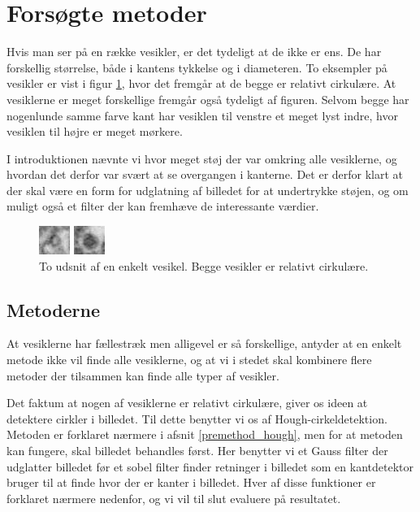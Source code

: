 \section{Forsøgte metoder}
Hvis man ser på en række vesikler, er det tydeligt at de ikke er ens. De har forskellig størrelse, både i kantens tykkelse og i diameteren. To eksempler på vesikler er vist i figur \ref{fig:premethod_ves1}, hvor det fremgår at de begge er relativt cirkulære. At vesiklerne er meget forskellige fremgår også tydeligt af figuren. Selvom begge har nogenlunde samme farve kant har vesiklen til venstre et meget lyst indre, hvor vesiklen til højre er meget mørkere. 

I introduktionen nævnte vi hvor meget støj der var omkring alle vesiklerne, og hvordan det derfor var svært at se overgangen i kanterne. Det er derfor klart at der skal være en form for udglatning af billedet for at undertrykke støjen, og om muligt også et filter der kan fremhæve de interessante værdier.

\begin{figure}[H]
	\begin{minipage}[b]{0.5\linewidth}
		\centering
		\includegraphics[scale=5]{files/premethod/img/ves1.png}
	\end{minipage}
	\hspace{0.5cm}
	\begin{minipage}[b]{0.5\linewidth}
		\centering
		\includegraphics[scale=5]{files/premethod/img/ves2.png}
	\end{minipage}
	\caption{To udsnit af en enkelt vesikel. Begge vesikler er relativt cirkulære.\label{fig:premethod_ves1}}
\end{figure}

\subsection{Metoderne}	
At vesiklerne har fællestræk men alligevel er så forskellige, antyder at en enkelt metode ikke vil finde alle vesiklerne, og at vi i stedet skal kombinere flere metoder der tilsammen kan finde alle typer af vesikler.

Det faktum at nogen af vesiklerne er relativt cirkulære, giver os ideen at detektere cirkler i billedet. Til dette benytter vi os af Hough-cirkeldetektion. Metoden er forklaret nærmere i afsnit \ref{premethod_hough}, men for at metoden kan fungere, skal billedet behandles først. Her benytter vi et Gauss filter der udglatter billedet før et sobel filter finder retninger i billedet som en kantdetektor bruger til at finde hvor der er kanter i billedet. Hver af disse funktioner er forklaret nærmere nedenfor, og vi vil til slut evaluere på resultatet.

